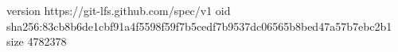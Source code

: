 version https://git-lfs.github.com/spec/v1
oid sha256:83cb8b6de1cbf91a4f5598f59f7b5cedf7b9537dc06565b8bed47a57b7ebc2b1
size 4782378

